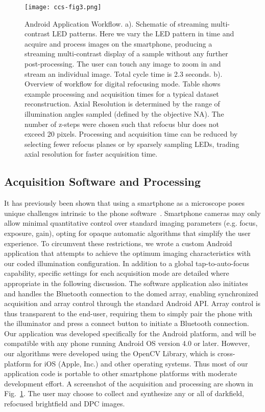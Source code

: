 \begin{figure}
\begin{center}
\texttt{[image: ccs-fig3.png]}
\end{center}
\caption {{Android Application Workflow.} {a).} Schematic of streaming multi-contrast LED patterns. Here we vary the LED pattern in time and acquire and process images on the smartphone, producing a streaming multi-contrast display of a sample without any further post-processing. The user can touch any image to zoom in and stream an individual image. Total cycle time is 2.3 seconds.
{b).} Overview of workflow for digital refocusing mode. Table shows example processing and acquisition times for a typical dataset reconstruction. Axial Resolution is determined by the range of illumination angles sampled (defined by the objective NA). The number of z-steps were chosen such that refocus blur does not exceed 20 pixels. Processing and acquisition time can be reduced by selecting fewer refocus planes or by sparsely sampling LEDs, trading axial resolution for faster acquisition time.}

\label{fig:android}
\end{figure} 

\subsection{Acquisition Software and Processing}
It has previously been shown that using a smartphone as a microscope poses unique challenges intrinsic to the phone software~\cite{10.1371/journal.pone.0096906}. Smartphone cameras may only allow minimal quantitative control over standard imaging parameters (e.g. focus, exposure, gain), opting for opaque automatic algorithms that simplify the user experience. To circumvent these restrictions, we wrote a custom Android application that attempts to achieve the optimum imaging characteristics with our coded illumination configuration. In addition to a global tap-to-auto-focus capability, specific settings for each acquisition mode are detailed where appropriate in the following discussion. The software application also initiates and handles the Bluetooth connection to the domed array, enabling synchronized acquisition and array control through the standard Android API. Array control is thus transparent to the end-user, requiring them to simply pair the phone with the illuminator and press a connect button to initiate a Bluetooth connection. Our application was developed specifically for the Android platform, and will be compatible with any phone running Android OS version 4.0 or later. However, our algorithms were developed using the OpenCV Library, which is cross-platform for iOS (Apple, Inc.) and other operating systems. Thus most of our application code is portable to other smartphone platforms with moderate development effort. A screenshot of the acquisition and processing are shown in Fig.~\ref{fig:android}. The user may choose to collect and synthesize any or all of darkfield, refocused brightfield and DPC images.

